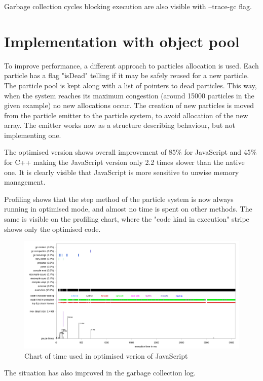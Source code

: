 Garbage collection cycles blocking execution are also visible with --trace-gc flag.



\section{Implementation with object pool}
\label{sec:particlesobjectpool}

To improve performance, a different approach to particles allocation is used. Each particle has a flag "isDead" telling if it may be safely reused for a new particle. The particle pool is kept along with a list of pointers to dead particles. This way, when the system reaches its maximum congestion (around 15000 particles in the given example) no new allocations occur.
The creation of new particles is moved from the particle emitter to the particle system, to avoid allocation of the new array. The emitter works now as a structure describing behaviour, but not implementing one.




The optimised version shows overall improvement of 85\% for JavaScript and 45\% for C++ making the JavaScript version only 2.2 times slower than the native one. It is clearly visible that JavaScript is more sensitive to unwise memory management.



Profiling shows that the step method of the particle system is now always running in optimised mode, and almost no time is spent on other methods. The same is visible on the profiling chart, where the "code kind in execution" stripe shows only the optimised code.

\begin{figure}[h!]
  \caption{Chart of time used in optimised verion of JavaScript}
  \label{img:particles2profile}
  \centering
	\includegraphics[width=16cm]{particles/particles2-profile.png}
\end{figure} 

The situation has also improved in the garbage collection log.


